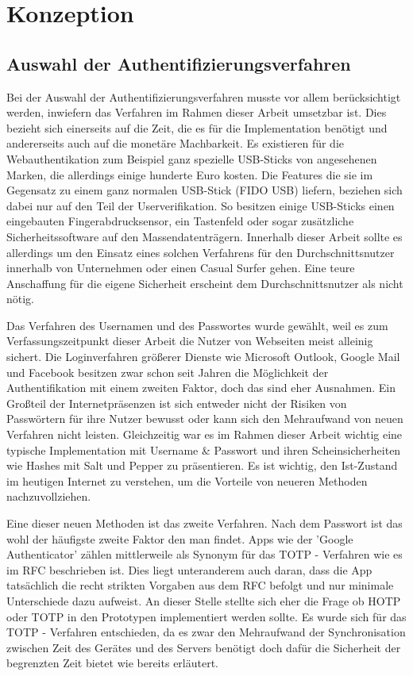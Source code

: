 \chapter{Konzeption}
\section{Auswahl der Authentifizierungsverfahren}
Bei der Auswahl der Authentifizierungsverfahren musste vor allem berücksichtigt werden, inwiefern das Verfahren im Rahmen dieser Arbeit umsetzbar ist. Dies bezieht sich einerseits auf die Zeit, die es für die Implementation benötigt und andererseits auch auf die monetäre Machbarkeit. Es existieren für die Webauthentikation zum Beispiel ganz spezielle USB-Sticks von angesehenen Marken, die allerdings einige hunderte Euro kosten. Die Features die sie im Gegensatz zu einem ganz normalen USB-Stick (FIDO USB) liefern, beziehen sich dabei nur auf den Teil der Userverifikation. So besitzen einige USB-Sticks einen eingebauten Fingerabdrucksensor, ein Tastenfeld oder sogar zusätzliche Sicherheitssoftware auf den Massendatenträgern. Innerhalb dieser Arbeit sollte es allerdings um den Einsatz eines solchen Verfahrens für den Durchschnittsnutzer innerhalb von Unternehmen oder einen Casual Surfer gehen. Eine teure Anschaffung für die eigene Sicherheit erscheint dem Durchschnittsnutzer als nicht nötig.

Das Verfahren des Usernamen und des Passwortes wurde gewählt, weil es zum Verfassungszeitpunkt dieser Arbeit die Nutzer von Webseiten meist alleinig sichert. Die Loginverfahren größerer Dienste wie Microsoft Outlook, Google Mail und Facebook besitzen zwar schon seit Jahren die Möglichkeit der Authentifikation mit einem zweiten Faktor, doch das sind eher Ausnahmen. Ein Großteil der Internetpräsenzen ist sich entweder nicht der Risiken von Passwörtern für ihre Nutzer bewusst oder kann sich den Mehraufwand von neuen Verfahren nicht leisten. Gleichzeitig war es im Rahmen dieser Arbeit wichtig eine typische Implementation mit Username \& Passwort und ihren Scheinsicherheiten wie Hashes mit Salt und Pepper zu präsentieren. Es ist wichtig, den Ist-Zustand im heutigen Internet zu verstehen, um die Vorteile von neueren Methoden nachzuvollziehen.

Eine dieser neuen Methoden ist das zweite Verfahren. Nach dem Passwort ist das wohl der häufigste zweite Faktor den man findet. Apps wie der 'Google Authenticator' zählen mittlerweile als Synonym für das TOTP - Verfahren wie es im RFC beschrieben ist. Dies liegt unteranderem auch daran, dass die App tatsächlich die recht strikten Vorgaben aus dem RFC befolgt und nur minimale Unterschiede dazu aufweist. An dieser Stelle stellte sich eher die Frage ob HOTP oder TOTP in den Prototypen implementiert werden sollte. Es wurde sich für das TOTP - Verfahren entschieden, da es zwar den Mehraufwand der Synchronisation zwischen Zeit des Gerätes und des Servers benötigt doch dafür die Sicherheit der begrenzten Zeit bietet wie bereits erläutert.

